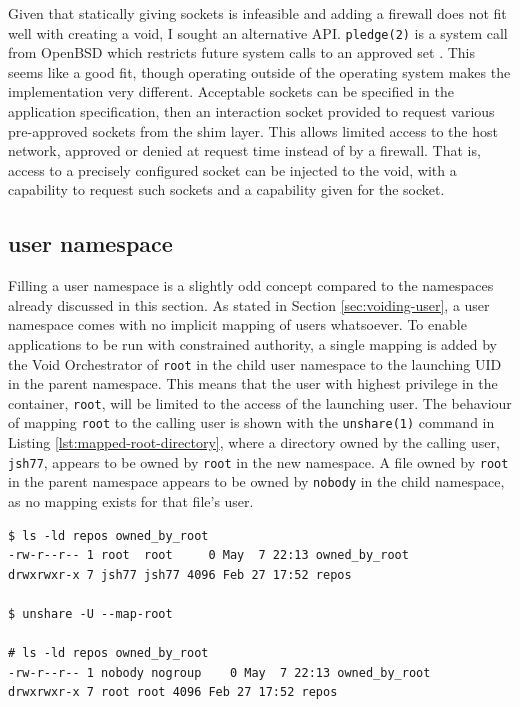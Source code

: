 \documentclass[sigplan]{acmart}
\begin{document}
Given that statically giving sockets is infeasible and adding a firewall does not fit well with creating a void, I sought an alternative API. \texttt{pledge(2)} is a system call from OpenBSD which restricts future system calls to an approved set \citep{the_openbsd_foundation_pledge2_2022}. This seems like a good fit, though operating outside of the operating system makes the implementation very different. Acceptable sockets can be specified in the application specification, then an interaction socket provided to request various pre-approved sockets from the shim layer. This allows limited access to the host network, approved or denied at request time instead of by a firewall. That is, access to a precisely configured socket can be injected to the void, with a capability to request such sockets and a capability given for the socket.

\subsection{user namespace}
\label{sec:filling-user}

Filling a user namespace is a slightly odd concept compared to the namespaces already discussed in this section. As stated in Section \ref{sec:voiding-user}, a user namespace comes with no implicit mapping of users whatsoever. To enable applications to be run with constrained authority, a single mapping is added by the Void Orchestrator of \texttt{root} in the child user namespace to the launching UID in the parent namespace. This means that the user with highest privilege in the container, \texttt{root}, will be limited to the access of the launching user. The behaviour of mapping \texttt{root} to the calling user is shown with the \texttt{unshare(1)} command in Listing \ref{lst:mapped-root-directory}, where a directory owned by the calling user, \texttt{jsh77}, appears to be owned by \texttt{root} in the new namespace. A file owned by \texttt{root} in the parent namespace appears to be owned by \texttt{nobody} in the child namespace, as no mapping exists for that file's user.

\begin{lstlisting}[float,label={lst:mapped-root-directory}]
$ ls -ld repos owned_by_root
-rw-r--r-- 1 root  root     0 May  7 22:13 owned_by_root
drwxrwxr-x 7 jsh77 jsh77 4096 Feb 27 17:52 repos

$ unshare -U --map-root

# ls -ld repos owned_by_root
-rw-r--r-- 1 nobody nogroup    0 May  7 22:13 owned_by_root
drwxrwxr-x 7 root root 4096 Feb 27 17:52 repos
\end{lstlisting}
\end{document}
